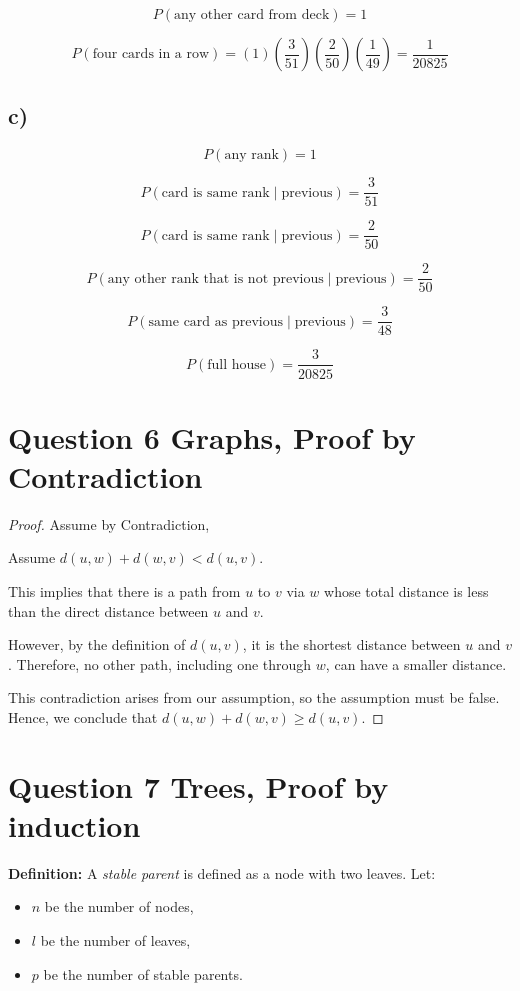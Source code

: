 \documentclass[11pt,fleqn]{article}
\theoremstyle{definition}
\theoremstyle{remark}
\begin{document}
\[
P(\text{any other card from deck}) = 1
\]

\[
P(\text{four cards in a row}) = \left(1\right) \left(\frac{3}{51}\right) \left(\frac{2}{50}\right) \left(\frac{1}{49}\right) = \frac{1}{20825}
\]

\subsection*{c)}
\[
P(\text{any rank}) = 1
\]

\[
P(\text{card is same rank} \mid \text{previous}) = \frac{3}{51}
\]

\[
P(\text{card is same rank} \mid \text{previous}) = \frac{2}{50}
\]

\[
P(\text{any other rank that is not previous} \mid \text{previous}) = \frac{2}{50}
\]

\[
P(\text{same card as previous} \mid \text{previous}) = \frac{3}{48}
\]

\[
P(\text{full house}) = \frac{3}{20825}
\]

\section{Question 6 Graphs, Proof by Contradiction}
 
    \begin{proof}
        Assume by Contradiction,
        
        Assume \( d(u,w) + d(w,v) < d(u,v) \).
        
        This implies that there is a path from \( u \) to \( v \) via \( w \) whose total distance is less than the direct distance between \( u \) and \( v \).

        However, by the definition of \( d(u,v) \), it is the shortest distance between \( u \) and \( v \). Therefore, no other path, including one through \( w \), can have a smaller distance.

        This contradiction arises from our assumption, so the assumption must be false. Hence, we conclude that \( d(u,w) + d(w,v) \geq d(u,v) \).
    \end{proof}
        
    

\newpage
\clearpage

\section{Question 7 Trees, Proof by induction}
    \textbf{Definition:} A \emph{stable parent} is defined as a node with two leaves. Let:
    \begin{itemize}
        \item \( n \) be the number of nodes,
        \item \( l \) be the number of leaves,
        \item \( p \) be the number of stable parents.
    \end{itemize}
\end{document}

